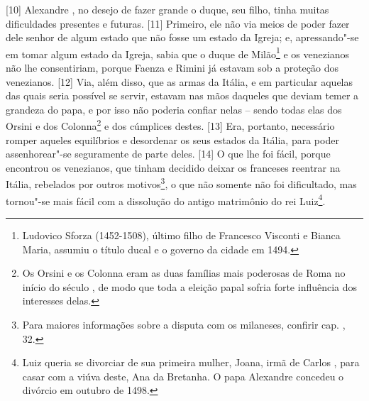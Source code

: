 {[}10{]} Alexandre , no desejo de fazer grande o duque, seu filho,
tinha muitas dificuldades presentes e futuras. {[}11{]} Primeiro, ele
não via meios de poder fazer dele senhor de algum estado que não fosse
um estado da Igreja; e, apressando"-se em tomar algum estado da Igreja,
sabia que o duque de Milão\footnote{Ludovico Sforza (1452-1508), último
  filho de Francesco Visconti e Bianca Maria, assumiu o título ducal e o
  governo da cidade em 1494.} e os venezianos não lhe consentiriam,
porque Faenza e Rimini já estavam sob a proteção dos venezianos.
{[}12{]} Via, além disso, que as armas da Itália, e em particular
aquelas das quais seria possível se servir, estavam nas mãos daqueles
que deviam temer a grandeza do papa, e por isso não poderia confiar
nelas -- sendo todas elas dos Orsini e dos Colonna\footnote{Os Orsini e
  os Colonna eram as duas famílias mais poderosas de Roma no início do
  século , de
  modo que toda a eleição papal sofria forte influência dos interesses
  delas.} e dos cúmplices destes. {[}13{]} Era, portanto, necessário
romper aqueles equilíbrios e desordenar os seus estados da Itália, para
poder assenhorear"-se seguramente de parte deles. {[}14{]} O que lhe foi
fácil, porque encontrou os venezianos, que tinham decidido deixar os
franceses reentrar na Itália, rebelados por outros motivos\footnote{Para
  maiores informações sobre a disputa com os milaneses, confirir cap.
  , 32.}, o que não somente não foi dificultado, mas tornou"-se mais
fácil com a dissolução do antigo matrimônio do rei Luiz\footnote{Luiz
  queria se divorciar de sua primeira mulher, Joana, irmã de Carlos
  , para casar com a viúva deste, Ana da Bretanha. O papa Alexandre
   concedeu o divórcio em outubro de 1498.}.

